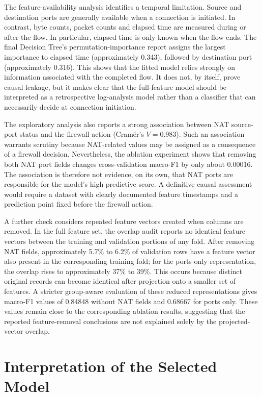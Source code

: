 The feature-availability analysis identifies a temporal limitation. Source and destination ports are generally available when a connection is initiated. In contrast, byte counts, packet counts and elapsed time are measured during or after the flow. In particular, elapsed time is only known when the flow ends. The final Decision Tree's permutation-importance report assigns the largest importance to elapsed time (approximately 0.343), followed by destination port (approximately 0.316). This shows that the fitted model relies strongly on information associated with the completed flow. It does not, by itself, prove causal leakage, but it makes clear that the full-feature model should be interpreted as a retrospective log-analysis model rather than a classifier that can necessarily decide at connection initiation.

The exploratory analysis also reports a strong association between NAT source-port status and the firewall action (Cram\'er's $V=0.983$). Such an association warrants scrutiny because NAT-related values may be assigned as a consequence of a firewall decision. Nevertheless, the ablation experiment shows that removing both NAT port fields changes cross-validation macro-F1 by only about 0.00016. The association is therefore not evidence, on its own, that NAT ports are responsible for the model's high predictive score. A definitive causal assessment would require a dataset with clearly documented feature timestamps and a prediction point fixed before the firewall action.

A further check considers repeated feature vectors created when columns are removed. In the full feature set, the overlap audit reports no identical feature vectors between the training and validation portions of any fold. After removing NAT fields, approximately 5.7\% to 6.2\% of validation rows have a feature vector also present in the corresponding training fold; for the ports-only representation, the overlap rises to approximately 37\% to 39\%. This occurs because distinct original records can become identical after projection onto a smaller set of features. A stricter group-aware evaluation of these reduced representations gives macro-F1 values of 0.84848 without NAT fields and 0.68667 for ports only. These values remain close to the corresponding ablation results, suggesting that the reported feature-removal conclusions are not explained solely by the projected-vector overlap.

\section{Interpretation of the Selected Model}\label{sec:interpretation}

